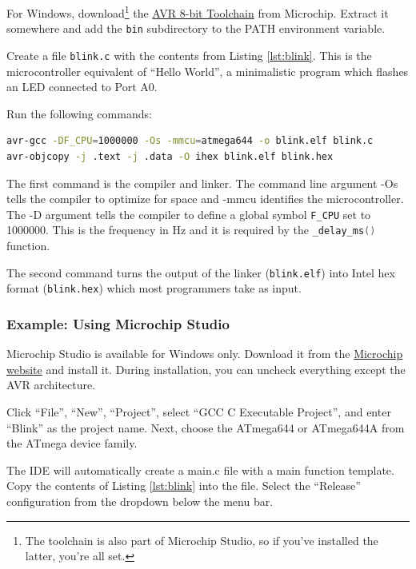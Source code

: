 \documentclass{article}
\newcommand{\file}[1]{\texttt{#1}}
\begin{document}
For Windows, download\footnote{The toolchain is also part of Microchip Studio, so if you've installed the latter, you're all set.} the \href{https://www.microchip.com/en-us/tools-resources/develop/microchip-studio/gcc-compilers/}{AVR 8-bit Toolchain} from Microchip. Extract it somewhere and add the \file{bin} subdirectory to the PATH environment variable. 

Create a file \file{blink.c} with the contents from Listing \ref{lst:blink}. This is the microcontroller equivalent of ``Hello World'', a minimalistic program which flashes an LED connected to Port A0. 



Run the following commands:
\begin{lstlisting}[language=bash]
avr-gcc -DF_CPU=1000000 -Os -mmcu=atmega644 -o blink.elf blink.c
avr-objcopy -j .text -j .data -O ihex blink.elf blink.hex
\end{lstlisting}

The first command is the compiler and linker. The command line argument -Os tells the compiler to optimize for space and -mmcu identifies the microcontroller. The -D argument tells the compiler to define a global symbol \lstinline[language=C]{F_CPU} set to 1000000. This is the frequency in Hz and it is required by the \lstinline[language=C]{_delay_ms()} function. 

The second command turns the output of the linker (\file{blink.elf}) into Intel hex format (\file{blink.hex}) which most programmers take as input. 

\subsubsection{Example: Using Microchip Studio}\label{sec:exMchpStudio}
Microchip Studio is available for Windows only. Download it from the \href{https://www.microchip.com/en-us/tools-resources/develop/microchip-studio#Downloads}{Microchip website} and install it. During installation, you can uncheck everything except the AVR architecture. 

Click ``File'', ``New'', ``Project'', select ``GCC C Executable Project'', and enter ``Blink'' as the project name. Next, choose the ATmega644 or ATmega644A from the ATmega device family. 

The IDE will automatically create a main.c file with a main function template. Copy the contents of Listing \ref{lst:blink} into the file. Select the ``Release'' configuration from the dropdown below the menu bar. 
\end{document}
